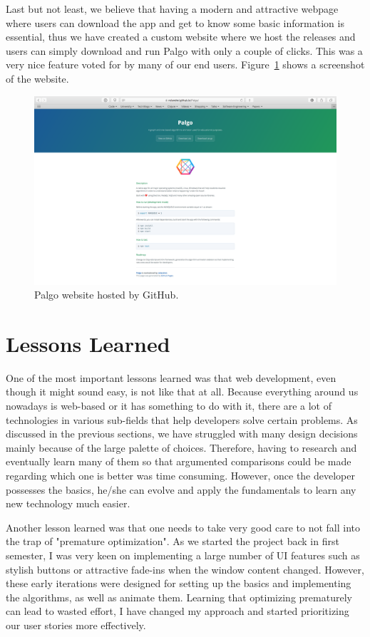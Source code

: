\documentclass{l4proj}
\begin{document}
\pagebreak

Last but not least, we believe that having a modern and attractive webpage where users can download the app and get to
know some basic information is essential, thus we have created a custom website where we host the releases and users can simply
download and run Palgo with only a couple of clicks. This was a very nice feature voted for by many of our end users.
Figure~\ref{fig:palgo-website} shows a screenshot of the website.

\begin{figure}[!ht]
\centering
\includegraphics[scale=0.3]{palgo-website}
\caption{Palgo website hosted by GitHub.}
\label{fig:palgo-website}
\end{figure}

\section{Lessons Learned}

One of the most important lessons learned was that web development, even though it might sound easy, is not like that at all.
Because everything around us nowadays is web-based or it has something to do with it, there are a lot of technologies in
various sub-fields that help developers solve certain problems. As discussed in the previous sections, we have struggled
with many design decisions mainly because of the large palette of choices. Therefore, having to research and eventually
learn many of them so that argumented comparisons could be made regarding which one is better was time consuming.
However, once the developer possesses the basics, he/she can evolve and apply the fundamentals to learn any new
technology much easier.

Another lesson learned was that one needs to take very good care to not fall into the trap of "premature optimization".
As we started the project back in first semester, I was very keen on implementing a large number of UI features such as
stylish buttons or attractive fade-ins when the window content changed. However, these early iterations were designed
for setting up the basics and implementing the algorithms, as well as animate them. Learning that optimizing prematurely
can lead to wasted effort, I have changed my approach and started prioritizing our user stories more effectively.
\end{document}
